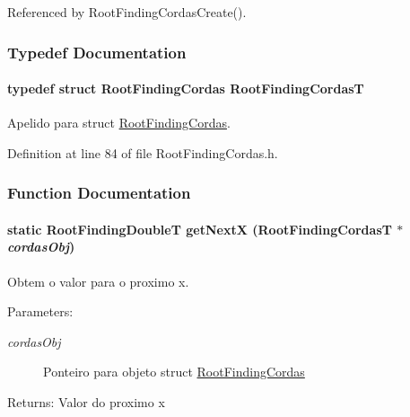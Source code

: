 Referenced by RootFindingCordasCreate().

\subsubsection{Typedef Documentation}
\hypertarget{group____cordas_g64e9f7aa0b38cc4c243e37b277b115d4}{
\paragraph[RootFindingCordasT]{\setlength{\rightskip}{0pt plus 5cm}typedef struct {\bf RootFindingCordas} {\bf RootFindingCordasT}}\hfill}
\label{group____cordas_g64e9f7aa0b38cc4c243e37b277b115d4}


Apelido para struct \hyperlink{structRootFindingCordas}{RootFindingCordas}. 



Definition at line 84 of file RootFindingCordas.h.

\subsubsection{Function Documentation}
\hypertarget{group____cordas_gb05e2f747de939224f70b38852f66c07}{
\paragraph[getNextX]{\setlength{\rightskip}{0pt plus 5cm}static {\bf RootFindingDoubleT} getNextX ({\bf RootFindingCordasT} $\ast$ {\em cordasObj})}\hfill}
\label{group____cordas_gb05e2f747de939224f70b38852f66c07}


Obtem o valor para o proximo x. 

\begin{Desc}
\item[Parameters:]
\begin{description}
\item[{\em cordasObj}]Ponteiro para objeto struct \hyperlink{structRootFindingCordas}{RootFindingCordas} \end{description}
\end{Desc}
\begin{Desc}
\item[Returns:]Valor do proximo x \end{Desc}


